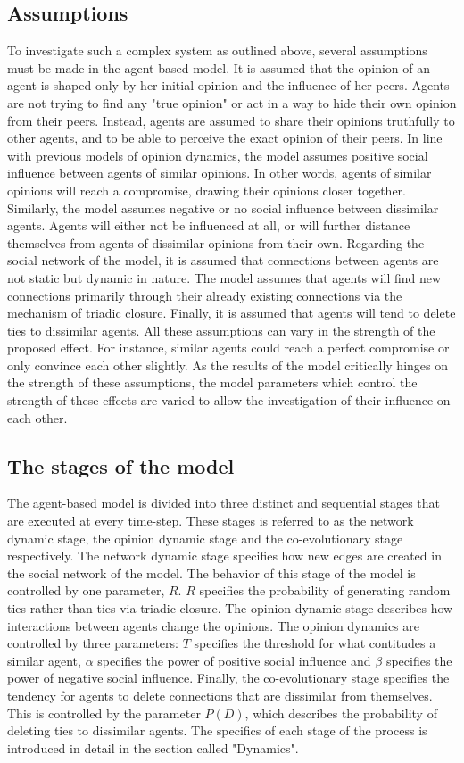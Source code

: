 \documentclass{article}
\begin{document}
\subsection{Assumptions}
To investigate such a complex system as outlined above, several assumptions must be made in the agent-based model. It is assumed that the opinion of an agent is shaped only by her initial opinion and the influence of her peers. 
Agents are not trying to find any "true opinion" or act in a way to hide their own opinion from their peers. Instead, agents are assumed to share their opinions truthfully to other agents, and to be able to perceive the exact opinion of their peers. 
In line with previous models of opinion dynamics, the model assumes positive social influence between agents of similar opinions. In other words, agents of similar opinions will reach a compromise, drawing their opinions closer together. Similarly, the model assumes negative or no social influence between dissimilar agents. Agents will either not be influenced at all, or will further distance themselves from agents of dissimilar opinions from their own.
Regarding the social network of the model, it is assumed that connections between agents are not static but dynamic in nature. 
The model assumes that agents will find new connections primarily through their already existing connections via the mechanism of triadic closure. Finally, it is assumed that agents will tend to delete ties to dissimilar agents.
All these assumptions can vary in the strength of the proposed effect. For instance, similar agents could reach a perfect compromise or only convince each other slightly. 
As the results of the model critically hinges on the strength of these assumptions, the model parameters which control the strength of these effects are varied to allow the investigation of their influence on each other. 

\subsection{The stages of the model}
The agent-based model is divided into three distinct and sequential stages that are executed at every time-step.
These stages is referred to as the network dynamic stage, the opinion dynamic stage and the co-evolutionary stage respectively.
The network dynamic stage specifies how new edges are created in the social network of the model. The behavior of this stage of the model is controlled by one parameter, $R$. $R$ specifies the probability of generating random ties rather than ties via triadic closure.
The opinion dynamic stage describes how interactions between agents change the opinions. The opinion dynamics are controlled by three parameters: $T$ specifies the threshold for what contitudes a similar agent, $\alpha$ specifies the power of positive social influence and $\beta$ specifies the power of negative social influence.
Finally, the co-evolutionary stage specifies the tendency for agents to delete connections that are dissimilar from themselves. This is controlled by the parameter $P(D)$, which describes the probability of deleting ties to dissimilar agents. The specifics of each stage of the process is introduced in detail in the section called "Dynamics".  
\end{document}
